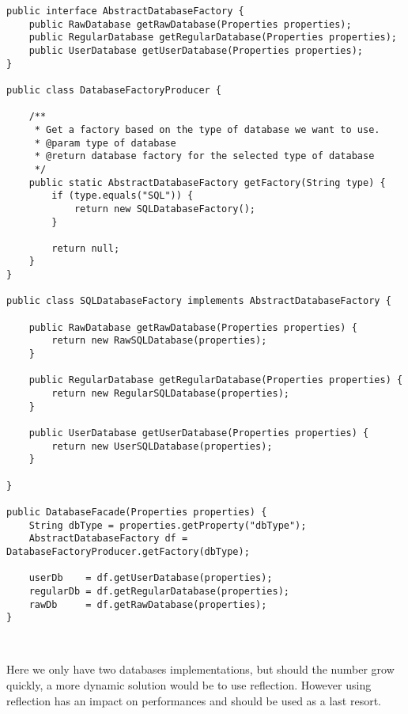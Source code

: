 \begin{lstlisting}
public interface AbstractDatabaseFactory {
	public RawDatabase getRawDatabase(Properties properties);
	public RegularDatabase getRegularDatabase(Properties properties);
	public UserDatabase getUserDatabase(Properties properties);
}

public class DatabaseFactoryProducer {
	
	/**
	 * Get a factory based on the type of database we want to use.
	 * @param type of database
	 * @return database factory for the selected type of database
	 */
	public static AbstractDatabaseFactory getFactory(String type) {
		if (type.equals("SQL")) {
			return new SQLDatabaseFactory();
		}
		
		return null;
	}
}

public class SQLDatabaseFactory implements AbstractDatabaseFactory {

	public RawDatabase getRawDatabase(Properties properties) {
		return new RawSQLDatabase(properties);
	}

	public RegularDatabase getRegularDatabase(Properties properties) {
		return new RegularSQLDatabase(properties);
	}

	public UserDatabase getUserDatabase(Properties properties) {
		return new UserSQLDatabase(properties);
	}

}

public DatabaseFacade(Properties properties) {
	String dbType = properties.getProperty("dbType");
	AbstractDatabaseFactory df = DatabaseFactoryProducer.getFactory(dbType);
	
	userDb    = df.getUserDatabase(properties);
	regularDb = df.getRegularDatabase(properties);
	rawDb     = df.getRawDatabase(properties);
}
\end{lstlisting}
\

Here we only have two databases implementations, but should the number grow
quickly, a more dynamic solution would be to use reflection. However using
reflection has an impact on performances and should be used as a last resort.


\newpage
